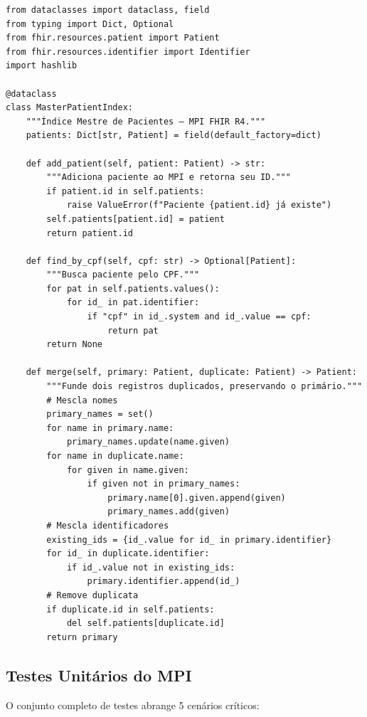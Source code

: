\begin{lstlisting}[style=pythonstyle, caption=Ciclo GREEN: implementação mínima do MPI, label=code:tdd_green]
from dataclasses import dataclass, field
from typing import Dict, Optional
from fhir.resources.patient import Patient
from fhir.resources.identifier import Identifier
import hashlib

@dataclass
class MasterPatientIndex:
    """Índice Mestre de Pacientes — MPI FHIR R4."""
    patients: Dict[str, Patient] = field(default_factory=dict)
    
    def add_patient(self, patient: Patient) -> str:
        """Adiciona paciente ao MPI e retorna seu ID."""
        if patient.id in self.patients:
            raise ValueError(f"Paciente {patient.id} já existe")
        self.patients[patient.id] = patient
        return patient.id
    
    def find_by_cpf(self, cpf: str) -> Optional[Patient]:
        """Busca paciente pelo CPF."""
        for pat in self.patients.values():
            for id_ in pat.identifier:
                if "cpf" in id_.system and id_.value == cpf:
                    return pat
        return None
    
    def merge(self, primary: Patient, duplicate: Patient) -> Patient:
        """Funde dois registros duplicados, preservando o primário."""
        # Mescla nomes
        primary_names = set()
        for name in primary.name:
            primary_names.update(name.given)
        for name in duplicate.name:
            for given in name.given:
                if given not in primary_names:
                    primary.name[0].given.append(given)
                    primary_names.add(given)
        # Mescla identificadores
        existing_ids = {id_.value for id_ in primary.identifier}
        for id_ in duplicate.identifier:
            if id_.value not in existing_ids:
                primary.identifier.append(id_)
        # Remove duplicata
        if duplicate.id in self.patients:
            del self.patients[duplicate.id]
        return primary
\end{lstlisting}

\subsection{Testes Unitários do MPI}

O conjunto completo de testes abrange 5 cenários críticos:

